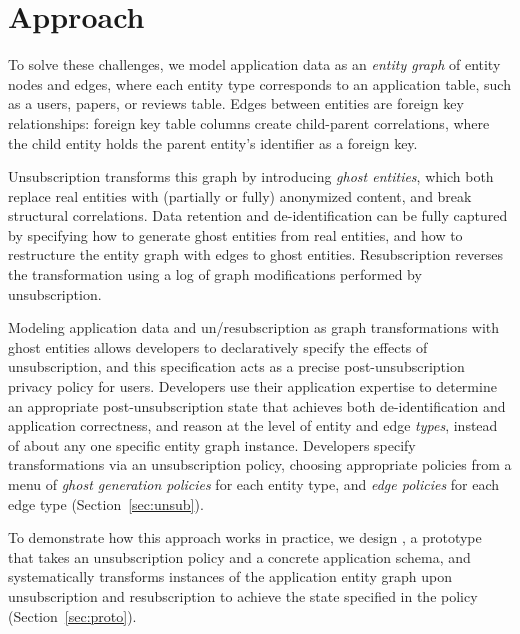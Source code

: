 \section{Approach}
To solve these challenges, we model application data as an \emph{entity graph} of entity nodes and edges, where each entity type
corresponds to an application table, such as a users, papers, or reviews table. Edges between
entities are foreign key relationships: foreign key table columns 
create child-parent correlations, where the child entity holds the
parent entity's identifier as a foreign key. 

Unsubscription transforms this graph by introducing \emph{ghost entities}, which both replace real
entities with (partially or fully) anonymized content, and break structural correlations. Data
retention and de-identification can be fully captured by specifying how to generate ghost
entities from real entities, and how to restructure the entity graph with edges to ghost entities.
Resubscription reverses the transformation using a log of graph modifications performed by 
unsubscription.

Modeling application data and un/resubscription as graph transformations with ghost entities allows
developers to declaratively specify the effects of unsubscription, and this specification 
acts as a precise post-unsubscription privacy policy for users. Developers use their application expertise
to determine an appropriate post-unsubscription state that achieves both de-identification and
application correctness, and reason at the level of entity and edge \emph{types}, instead of
about any one specific entity graph instance. Developers specify transformations via an unsubscription policy, 
choosing appropriate policies from a menu of \emph{ghost generation policies} for each entity type, and
\emph{edge policies} for each edge type (Section~\ref{sec:unsub}).

To demonstrate how this approach works in practice, we design \sys, a prototype that takes an unsubscription policy and a concrete
application schema, and systematically transforms instances of the application entity graph upon
unsubscription and resubscription to achieve the state specified in the policy
(Section~\ref{sec:proto}).

